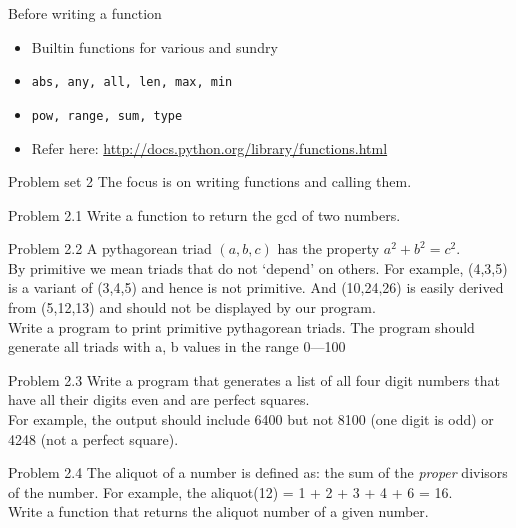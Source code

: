 \documentclass[14pt,compress]{beamer}
\newcounter{time}
\newcommand{\inctime}[1]{\addtocounter{time}{#1}{\tiny \thetime\ m}}
\newcommand{\typ}[1]{\texttt{#1}}
\begin{document}
\begin{frame}
  {Before writing a function}
  \begin{itemize}
      \item Builtin functions for various and sundry
      \item \typ{abs, any, all, len, max, min}
      \item \typ{pow, range, sum, type}
      \item Refer here:
          \url{http://docs.python.org/library/functions.html}
  \end{itemize}
  \inctime{10} 
\end{frame}

\begin{frame}{Problem set 2}
  The focus is on writing functions and calling them.
\end{frame}

\begin{frame}{Problem 2.1}
  Write a function to return the gcd of two numbers.
\end{frame}

\begin{frame}{Problem 2.2}
A pythagorean triad $(a,b,c)$ has the property $a^2 + b^2 = c^2$.\\By primitive we mean triads that do not `depend' on others. For example, (4,3,5) is a variant of (3,4,5) and hence is not primitive. And (10,24,26) is easily derived from (5,12,13) and should not be displayed by our program. \\
Write a program to print primitive pythagorean triads. The program should generate all triads with a, b values in the range 0---100
\end{frame}

\begin{frame}{Problem 2.3}
  Write a program that generates a list of all four digit numbers that have all their digits even and are perfect squares.\\For example, the output should include 6400 but not 8100 (one digit is odd) or 4248 (not a perfect square).
\end{frame}

\begin{frame}{Problem 2.4}
  The aliquot of a number is defined as: the sum of the \emph{proper} divisors of the number. For example, the aliquot(12) = 1 + 2 + 3 + 4 + 6 = 16.\\
  Write a function that returns the aliquot number of a given number. 
\end{frame}
\end{document}
